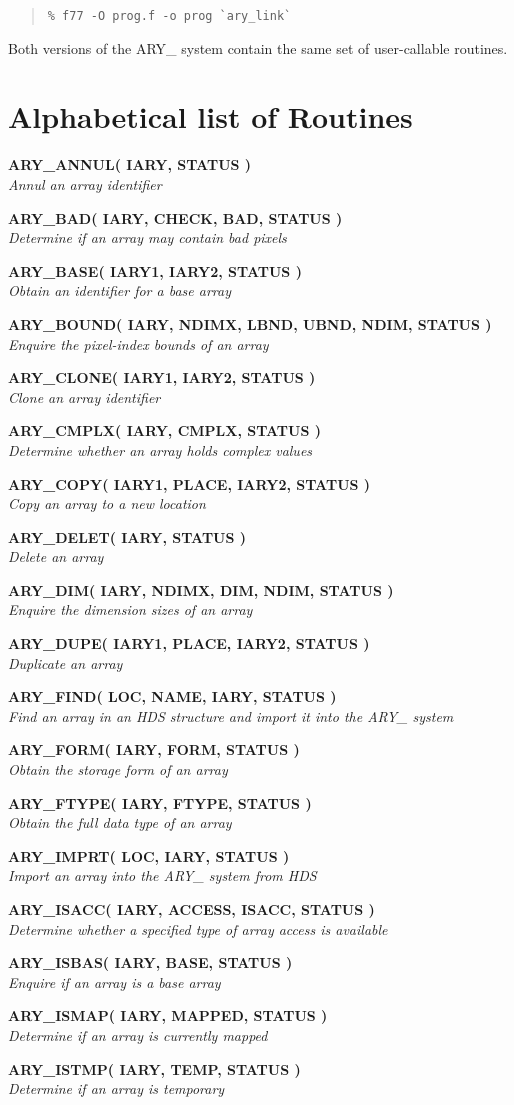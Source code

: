 \documentclass[twoside,11pt]{article}
\newcommand{\xlabel}[1]{}
\newcommand{\noteroutine}[2]{\textbf{#1}\hspace*{\fill}\nopagebreak \\
                             \hspace*{3em}\emph{#2}\hspace*{\fill}\par}
\begin{document}
\begin{quote}\begin{verbatim}
% f77 -O prog.f -o prog `ary_link`
\end{verbatim}\end{quote}

Both versions of the ARY\_ system contain the same set of user-callable
routines.  

\newpage
\appendix

\section{\xlabel{alphabetical_list_of_routines}Alphabetical list of Routines}
\label{alphabetical_list_of_routines}

\noteroutine{ARY\_ANNUL( IARY, STATUS )}
            {Annul an array identifier}
\noteroutine{ARY\_BAD( IARY, CHECK, BAD, STATUS )}
            {Determine if an array may contain bad pixels}
\noteroutine{ARY\_BASE( IARY1, IARY2, STATUS )}
            {Obtain an identifier for a base array}
\noteroutine{ARY\_BOUND( IARY, NDIMX, LBND, UBND, NDIM, STATUS )}
            {Enquire the pixel-index bounds of an array}
\noteroutine{ARY\_CLONE( IARY1, IARY2, STATUS )}
            {Clone an array identifier}
\noteroutine{ARY\_CMPLX( IARY, CMPLX, STATUS )}
            {Determine whether an array holds complex values}
\noteroutine{ARY\_COPY( IARY1, PLACE, IARY2, STATUS )}
            {Copy an array to a new location}
\noteroutine{ARY\_DELET( IARY, STATUS )}
            {Delete an array}
\noteroutine{ARY\_DIM( IARY, NDIMX, DIM, NDIM, STATUS )}
            {Enquire the dimension sizes of an array}
\noteroutine{ARY\_DUPE( IARY1, PLACE, IARY2, STATUS )}
            {Duplicate an array}
\noteroutine{ARY\_FIND( LOC, NAME, IARY, STATUS )}
            {Find an array in an HDS structure and import it into the ARY\_ system}
\noteroutine{ARY\_FORM( IARY, FORM, STATUS )}
            {Obtain the storage form of an array}
\noteroutine{ARY\_FTYPE( IARY, FTYPE, STATUS )}
            {Obtain the full data type of an array}
\noteroutine{ARY\_IMPRT( LOC, IARY, STATUS )}
            {Import an array into the ARY\_ system from HDS}
\noteroutine{ARY\_ISACC( IARY, ACCESS, ISACC, STATUS )}
            {Determine whether a specified type of array access is available}
\noteroutine{ARY\_ISBAS( IARY, BASE, STATUS )}
            {Enquire if an array is a base array}
\noteroutine{ARY\_ISMAP( IARY, MAPPED, STATUS )}
            {Determine if an array is currently mapped}
\noteroutine{ARY\_ISTMP( IARY, TEMP, STATUS )}
            {Determine if an array is temporary}
\end{document}
